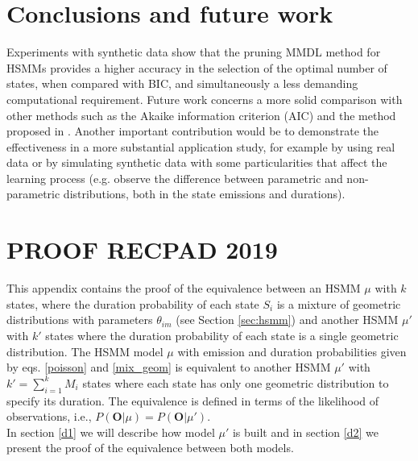 \documentclass[extendedabs]{recpad2k}
\begin{document}
\section{Conclusions and future work}
Experiments with synthetic data show that the pruning MMDL method for HSMMs provides a higher accuracy in the selection of the optimal number of states, when compared with BIC, and simultaneously a less demanding computational requirement. Future work concerns a more solid comparison with other methods such as the Akaike information criterion (AIC) and the method proposed in \citet{yu2015hidden}. Another important contribution would be to demonstrate the effectiveness in a more substantial application study, for example by using real data or by simulating synthetic data with some particularities that affect the learning process (e.g. observe the difference between parametric and non-parametric distributions, both in the state emissions and durations).

\footnotesize{

}
\clearpage
\iffalse
\section{PROOF RECPAD 2019}
This appendix contains the proof of the equivalence between an HSMM \textbf{$\mu$} with $k$ states, where the duration probability of each state $S_i$ is a mixture of geometric distributions with parameters $\theta_{im}$ (see Section \ref{sec:hsmm})
and another HSMM \textbf{$\mu'$} with $k'$ states where the duration probability of each state is a single geometric distribution.
The HSMM model $\mu$ with emission and duration probabilities given by eqs. \eqref{poisson} and \eqref{mix_geom} is equivalent to another HSMM $\mu'$ with $k'=\sum_{i=1}^k M_i$ states where each state has only one geometric distribution %
to specify its duration. The equivalence is defined in terms of the likelihood of observations, i.e., $P(\textbf{O}|\mu)=P(\textbf{O}|\mu')$. \\ \noindent
In section \ref{d1} we will describe how model $\mu'$ is built and in section \ref{d2} we present the proof of the equivalence between both models.
\end{document}
